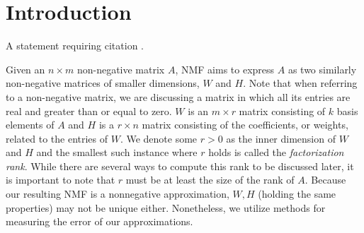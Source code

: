 \documentclass[
10pt, %
a4paper, %
oneside, %
headinclude,footinclude, %
BCOR5mm, %
]{scrartcl}
\begin{document}

\let\thefootnote\relax{}



\section{Introduction}

A statement requiring citation \cite{Figueredo:2009dg}.

Given an $n\times m$ non-negative matrix $A$, NMF aims to express $A$ as two similarly non-negative matrices of smaller dimensions, $W$ and $H$.
Note that when referring to a non-negative matrix, we are discussing a matrix in which all its entries are real and greater than or equal to zero.
$W$ is an $m\times r$ matrix consisting of $k$ basis elements of $A$ and $H$  is a $r\times n$ matrix consisting of the coefficients, or weights, related to the entries of $W$.
We denote some $r>0$ as the inner dimension of $W$ and $H$ and the smallest such instance where $r$ holds is called the \emph{factorization rank}.
While there are several ways to compute this rank to be discussed later, it is important to note that $r$ must be at least the size of the rank of $A$.
Because our resulting NMF is a nonnegative approximation, $W,H$ (holding the same properties) may not be unique either.
Nonetheless, we utilize methods for measuring the error of our approximations.

\end{document}
